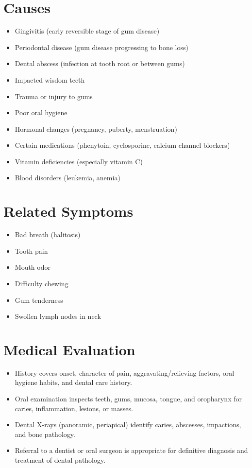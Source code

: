 \section*{Causes}
\begin{itemize}
  \item Gingivitis (early reversible stage of gum disease)
  \item Periodontal disease (gum disease progressing to bone loss)
  \item Dental abscess (infection at tooth root or between gums)
  \item Impacted wisdom teeth
  \item Trauma or injury to gums
  \item Poor oral hygiene
  \item Hormonal changes (pregnancy, puberty, menstruation)
  \item Certain medications (phenytoin, cyclosporine, calcium channel blockers)
  \item Vitamin deficiencies (especially vitamin C)
  \item Blood disorders (leukemia, anemia)
\end{itemize}

\section*{Related Symptoms}
\begin{itemize}
  \item Bad breath (halitosis)
  \item Tooth pain
  \item Mouth odor
  \item Difficulty chewing
  \item Gum tenderness
  \item Swollen lymph nodes in neck
\end{itemize}

\section*{Medical Evaluation}
\begin{itemize}
  \item History covers onset, character of pain, aggravating/relieving factors, oral hygiene habits, and dental care history.
  \item Oral examination inspects teeth, gums, mucosa, tongue, and oropharynx for caries, inflammation, lesions, or masses.
  \item Dental X-rays (panoramic, periapical) identify caries, abscesses, impactions, and bone pathology.
  \item Referral to a dentist or oral surgeon is appropriate for definitive diagnosis and treatment of dental pathology.
\end{itemize}

